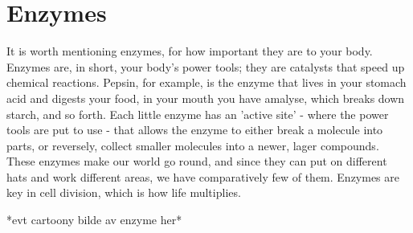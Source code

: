 \section{Enzymes}
It is worth mentioning enzymes, for how important they are to your body. Enzymes are, in short, your body's power tools; they are catalysts that speed up chemical reactions. Pepsin, for example, is the enzyme that lives in your stomach acid and digests your food, in your mouth you have amalyse, which breaks down starch, and so forth. Each little enzyme has an 'active site' - where the power tools are put to use - that allows the enzyme to either break a molecule into parts, or reversely, collect smaller molecules into a newer, lager compounds. These enzymes make our world go round, and since they can put on different hats and work different areas, we have comparatively few of them. Enzymes are key in cell division, which is how life multiplies. 

*evt cartoony bilde av enzyme her*


